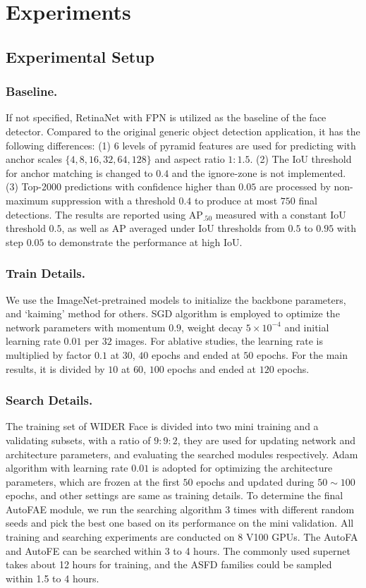 \documentclass[sigconf]{acmart}
\begin{document}
\section{Experiments}
\subsection{Experimental Setup}
\subsubsection{Baseline.} If not specified, RetinaNet \cite{lin2017focal} with FPN is utilized as the baseline of the face detector. Compared to the original generic object detection application, it has the following differences: (1) 6 levels of pyramid features are used for predicting with anchor scales $\{4,8,16,32,64,128\}$ and aspect ratio $1\!\!:\!\!1.5$. (2) The IoU threshold for anchor matching is changed to $0.4$ and the ignore-zone is not implemented. (3) Top-2000 predictions with confidence higher than $0.05$ are processed by non-maximum suppression with a threshold $0.4$ to produce at most $750$ final detections. 
The results are reported using AP$_{.50}$ measured with a constant IoU threshold $0.5$, as well as AP averaged under IoU thresholds from $0.5$ to $0.95$ with step $0.05$ to demonstrate the performance at high IoU.


\subsubsection{Train Details.} We use the ImageNet-pretrained models to initialize the backbone parameters, and `kaiming' method for others. SGD algorithm is employed to optimize the network parameters with momentum $0.9$, weight decay $5\!\times\!10^{-4}$ and initial learning rate $0.01$ per $32$ images. For ablative studies, the learning rate is multiplied by factor $0.1$ at $30$, $40$ epochs and ended at $50$ epochs.
For the main results, it is divided by $10$ at $60$, $100$ epochs and ended at $120$ epochs.


\subsubsection{Search Details.} The training set of WIDER Face is divided into two mini training and a validating subsets, with a ratio of $9\!:\!9\!:\!2$, they are used for updating network and architecture parameters, and evaluating the searched modules respectively.
Adam algorithm with learning rate $0.01$ is adopted for optimizing the architecture parameters, which are frozen at the first $50$ epochs and updated during $50\!\sim\!100$ epochs, and other settings are same as training details. To determine the final AutoFAE module, we run the searching algorithm $3$ times with different random seeds and pick the best one based on its performance on the mini validation. All training and searching experiments are conducted on 8 V100 GPUs. The AutoFA and AutoFE can be searched within 3 to 4 hours. The commonly used supernet takes about 12 hours for training, and the ASFD families could be sampled within 1.5 to 4 hours. 
\end{document}
